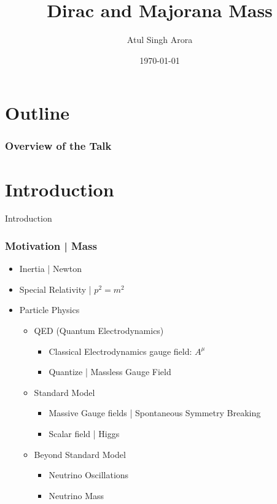 \documentclass{beamer}
\title[Dirac and Majorana Mass]{Dirac and Majorana Mass} %
\author{Atul Singh Arora} %
\institute[IISER M] %
{
Indian Institute of Science Education and Research Mohali \\ %
\medskip
}
\date{\today} %
\begin{document}
\begin{frame}
\titlepage %
\end{frame}

\section{Outline}
\begin{frame}
\frametitle{Overview of the Talk} %
\tableofcontents %
\end{frame}

\section{Introduction}
\begin{frame}	
	\Huge{\centerline{Introduction}}
\end{frame}


\begin{frame}
	\frametitle{Motivation | Mass}
		\begin{itemize}
			\item Inertia | Newton
			\pause
			\item Special Relativity | $p^{2}=m^{2}$
			\pause
			\item Particle Physics
			\begin{itemize}
				\item QED (Quantum Electrodynamics)
				\pause
				\begin{itemize}
					\item Classical Electrodynamics gauge field: $A^{\mu}$
					\pause
					\item Quantize | Massless Gauge Field
					\pause
				\end{itemize}
				\item Standard Model
				\begin{itemize}
					\item Massive Gauge fields | Spontaneous Symmetry Breaking
					\pause
					\item Scalar field | Higgs
					\pause
				\end{itemize}
				\item Beyond Standard Model
				\begin{itemize}
					\item Neutrino Oscillations
					\pause
					\item Neutrino Mass
					\pause
				\end{itemize}				
			\end{itemize}
		\end{itemize}
\end{frame}
\end{document}
